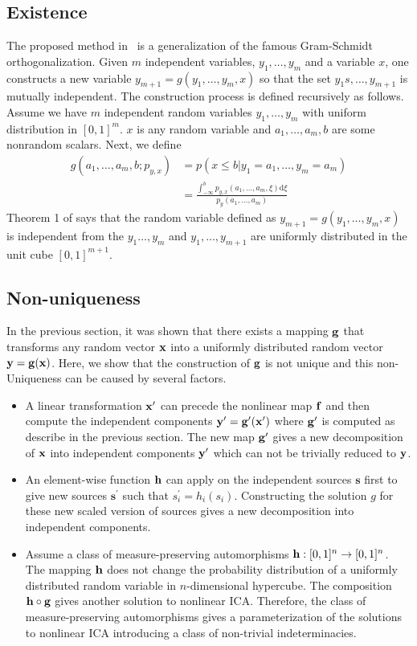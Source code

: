 \subsection{Existence}
The proposed method in~\cite{hyvarinen1999nonlinear} is a generalization of the famous Gram-Schmidt orthogonalization. Given $m$ independent variables, $y_1,\ldots,y_m$ and a variable $x$, one constructs a new variable $y_{m+1}=g(y_1,\ldots,y_m,x)$ so that the set $y_1s,\ldots,y_{m+1}$ is mutually independent. The construction process is defined recursively as follows. Assume we have $m$ independent random variables $y_1,\ldots,y_m$ with uniform distribution in $[0,1]^m$. $x$ is any random variable and $a_1,\ldots, a_m,b$ are some nonrandom scalars. Next, we define
\begin{align}
    g \left( a _ { 1 } , \ldots , a _ { m } , b ; p _ { y , x } \right) &= p ( x \leq b | y _ { 1 } = a _ { 1 } , \ldots , y _ { m } = a _ { m } )\nonumber\\
    &= \frac { \int _ { - \infty } ^ { b } p _ { y , x } \left( a _ { 1 } , \ldots , a _ { m } , \xi \right) \mathrm { d } \xi } { p _ { y } \left( a _ { 1 } , \ldots , a _ { m } \right) }
\end{align}
Theorem 1 of \cite{hyvarinen1999nonlinear} says that the random variable defined as $y_{m+1}=g(y_1,\ldots,y_m,x)$ is independent from the $y_1\ldots,y_m$ and $y_1,\ldots,y_{m+1}$ are uniformly distributed in the unit cube $[0,1]^{m+1}$.

\subsection{Non-uniqueness}
In the previous section, it was shown that there exists a mapping $\mathbf{g}$ that transforms any random vector $\mathbf{x}$ into a uniformly distributed random vector $\mathbf{y}=\mathbf{g}(\mathbf{x})$. Here, we show that the construction of $\mathbf{g}$ is not unique and this non-Uniqueness can be caused by several factors.
\begin{itemize}
    \item A linear transformation $\mathbf{x}^\prime$ can precede the nonlinear map $\mathbf{f}$ and then compute the independent components $\mathbf{y}^\prime=\mathbf{g}^\prime(\mathbf{x}^\prime)$ where $\mathbf{g}^\prime$ is computed as describe in the previous section. The new map $\mathbf{g}^\prime$ gives a new decomposition of $\mathbf{x}$ into independent components $\mathbf{y}^\prime$ which can not be trivially reduced to $\mathbf{y}$.
    \item An element-wise function $\mathbf{h}$ can apply on the independent sources $\bm{s}$ first to give new sources $\bm{s}^\prime$ such that $s_i^\prime=h_i(s_i)$. Constructing the solution $g$ for these new scaled version of sources gives a new decomposition into independent components.
    \item Assume a class of measure-preserving automorphisms $\mathbf{h}:[0,1]^n\to [0,1]^n$. The mapping $\mathbf{h}$ does not change the probability distribution of a uniformly distributed random variable in $n$-dimensional hypercube. The composition $\mathbf{h}\circ\mathbf{g}$ gives another solution to nonlinear ICA. Therefore, the class of measure-preserving automorphisms gives a parameterization of the solutions to nonlinear ICA introducing a class of non-trivial indeterminacies.
\end{itemize}


